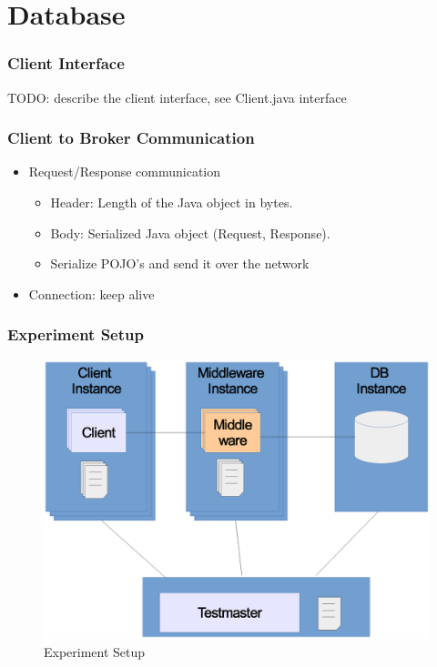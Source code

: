 \documentclass{beamer}
\begin{document}

\section{Database}
\begin{frame}
\frametitle{Client Interface}

TODO: describe the client interface, see Client.java interface

\end{frame}


\begin{frame}
\frametitle{Client to Broker Communication}

\begin{itemize}
\item Request/Response communication
\begin{itemize}
\item Header: Length of the Java object in bytes.
\item Body: Serialized Java object (Request, Response).
\item Serialize POJO's and send it over the network
\end{itemize}

\item Connection: keep alive
 
\end{itemize}
\end{frame}


\begin{frame}
\frametitle{Experiment Setup}
\begin{figure}
  \begin{center}
    \includegraphics[scale=0.4]{../../drawings/testsystem-overview.eps}
  \end{center}
  \caption{Experiment Setup}
  \label{fig:testsystem}
\end{figure}
\end{frame}
\end{document}
